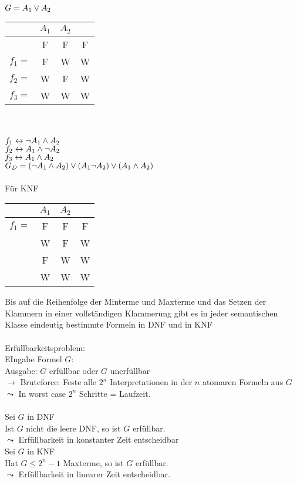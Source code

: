 \beispiel{}
$G = A_1 \vee A_2$\\
\begin{tabular}{lc|c|c}
  & $A_1$ & $A_2$ &  \\
\hline
 & F & F & F \\
$f_1=$ & F & W & W \\
$f_2=$ & W & F & W \\
$f_3=$ & W & W & W \\
\end{tabular}\\
\noindent\\
$f_1 \leftrightarrow \neg A_1 \wedge A_2$\\
$f_2 \leftrightarrow A_1 \wedge \neg A_2$\\
$f_3 \leftrightarrow A_1 \wedge A_2$\\
$G_D = ( \neg A_1 \wedge A_2 ) \vee (A_1 \neg A_2) \vee ( A_1 \wedge A_2)$\\
\noindent\\
Für KNF\\
\begin{tabular}{lc|c|c}
  & $A_1$ & $A_2$ &  \\
\hline
$f_1=$ & F & F & F \\
 & W & F & W \\
 & F & W & W \\
 & W & W & W \\
\end{tabular}

Bis auf die Reihenfolge der Minterme und Maxterme und das Setzen der Klammern in einer vollständigen Klammerung gibt es in jeder semantischen Klasse eindeutig bestimmte Formeln in DNF und in KNF\\

\noindent\\
Erfüllbarkeitsproblem:\\
EIngabe Formel $G$:\\
Ausgabe: $G$ erfüllbar oder $G$ unerfüllbar \\
$\rightarrow$ Bruteforce: Feste alle $2^n$ Interpretationen in der $n$ atomaren Formeln aus $G$ \\
$\leadsto$ In worst case $2^n$ Schritte = Laufzeit.\\

\noindent\\
Sei $G$ in DNF\\
Ist $G$ nicht die leere DNF, so ist $G$ erfüllbar.\\
$\leadsto$ Erfüllbarkeit in konstanter Zeit entscheidbar\\

\noindent
Sei $G$ in KNF\\
Hat $G \leq 2^n -1$ Maxterme, so ist $G$ erfüllbar.\\
$\leadsto$ Erfüllbarkeit in linearer Zeit entscheidbar.